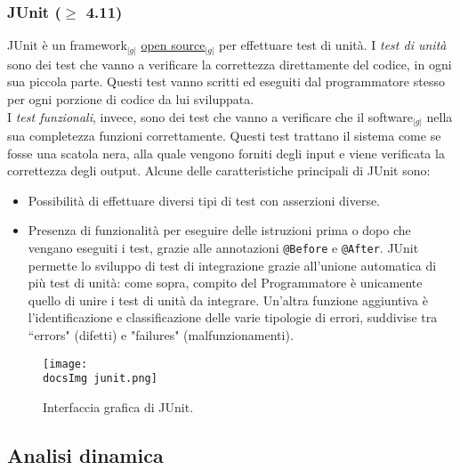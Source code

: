 {{		\subsubsection{JUnit ($\geqslant$ 4.11)}\label{junit}{
		    JUnit è un framework$_{|g|}$ \underline{open source}$_{|g|}$ per effettuare test di unità.
		    I \textit{test di unità} sono dei test che vanno a verificare la correttezza direttamente del codice, in ogni sua piccola parte. 
		    Questi test vanno scritti ed eseguiti dal programmatore stesso per ogni porzione di codice da lui sviluppata.\\
		    I \textit{test funzionali}, invece, sono dei test che vanno a verificare che il software$_{|g|}$ nella sua completezza 
		    funzioni correttamente. Questi test trattano il sistema come se fosse una scatola nera, 
		    alla quale vengono forniti degli input e viene verificata la correttezza degli output. 
		    Alcune delle caratteristiche principali di JUnit sono:
		    \begin{itemize}
		       \item Possibilità di effettuare diversi tipi di test con asserzioni diverse. 
		       \item Presenza di funzionalità per eseguire delle istruzioni prima o dopo che vengano eseguiti i test, 
			     grazie alle annotazioni \texttt{@Before} e \texttt{@After}.
		    JUnit permette lo sviluppo di test di integrazione grazie all'unione automatica di più test di unità: come sopra, compito del Programmatore è 
		    unicamente quello di unire i test di unità da integrare. Un'altra funzione aggiuntiva è l'identificazione e classificazione delle varie tipologie di 
		    errori, suddivise tra “errors" (difetti) e "failures" (malfunzionamenti).
		    \end{itemize}
		    \begin{center}
			\begin{figure}[h!]
				\centering
				\texttt{[image: \\docsImg junit.png]}
				\caption{Interfaccia grafica di JUnit.}	
			\end{figure}
		    \end{center}
	}

	\subsection{Analisi dinamica}{
}}}
